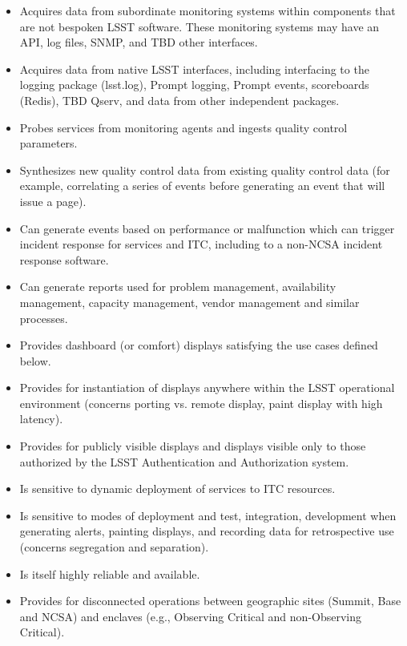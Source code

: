 \begin{itemize}

\item Acquires data from subordinate monitoring systems within components that
are not bespoken LSST software. These monitoring systems may have an API, log
files, SNMP, and TBD other interfaces.

\item Acquires data from native LSST interfaces, including interfacing to the
logging package (lsst.log),  Prompt logging, Prompt events,
scoreboards (Redis), TBD Qserv, and data from other independent packages.

\item Probes services from monitoring agents and ingests quality control
parameters.

\item Synthesizes new quality control data from existing quality control data
(for example, correlating a series of events before generating an event that
will issue a page).

\item Can generate events based on performance or malfunction which can trigger
incident response for services and ITC, including to a non-NCSA incident
response software.

\item Can generate reports used for problem management, availability management,
capacity management, vendor management and similar processes.

\item Provides dashboard (or comfort) displays satisfying the use cases defined
below.

\item Provides for instantiation of displays anywhere within the LSST
operational environment (concerns porting vs. remote display, paint display with
high latency).

\item Provides for publicly visible displays and displays visible only to those
authorized by the LSST Authentication and Authorization system.

\item Is sensitive to dynamic deployment of services to ITC resources.

\item Is sensitive to modes of deployment and test, integration, development
when generating alerts, painting displays, and recording data for retrospective
use (concerns segregation and separation).

\item Is itself highly reliable and available.

\item Provides for disconnected operations between geographic sites (Summit,
Base and NCSA) and enclaves (e.g., Observing Critical and non-Observing
Critical).

\end{itemize}

